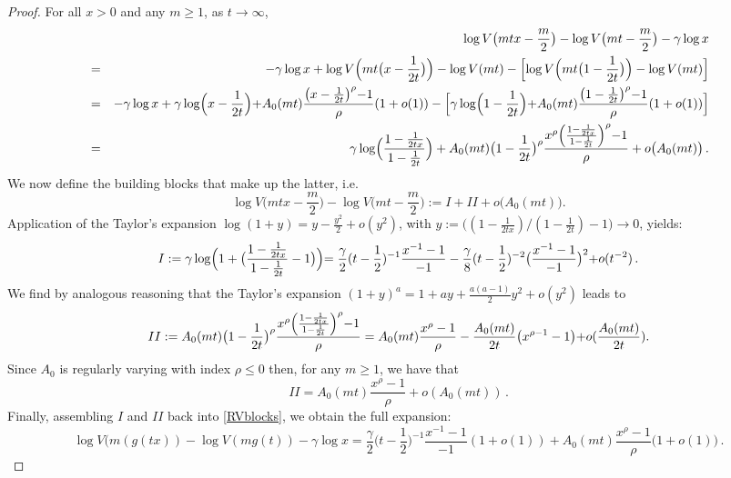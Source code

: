 \documentclass[11pt, a4paper, oneside]{article}
\numberwithin{equation}{section}
\theoremstyle{plain}
\theoremstyle{definition}
\begin{document}
\begin{proof}
        For all $x>0$ and any $m \geq 1$, as $t \rightarrow \infty$,
    \begin{eqnarray*}
 & &\log V \bigl(mtx -\frac{m}{2} \bigr) - \log V\bigl(mt -\frac{m}{2} \bigr) - \gamma\log x\\
 &=& -\gamma\log x +\log V \Bigl( mt \bigl(x -\frac{1}{2t} \bigr) \Bigr) -\log V(mt) - \Bigl[\log  V \Bigl( mt \bigl(1 -\frac{1}{2t} \bigr) \Bigr) -\log V(mt)\Bigr]\\
 &=& -\gamma\log x + \gamma\log \Bigl(x-\frac{1}{2t}\Bigl)+A_{0}(mt)\frac{\bigl(x-\frac{1}{2t}\bigl)^{\rho}-1}{\rho}(1+o(1))-\Bigl[\gamma\log\Bigl(1-\frac{1}{2t}\Bigl)+A_{0}(mt)\frac{\bigl(1-\frac{1}{2t}\bigl)^{\rho}-1}{\rho}(1+o(1))\Bigr]\\
 &=&\gamma\log \Bigl(\frac{1-\frac{1}{2tx}}{1-\frac{1}{2t}} \Bigr)+A_{0}(mt)\bigl(1-\frac{1}{2t}\bigr)^{\rho} \frac{x^{\rho} \Bigl(\frac{1-\frac{1}{2tx}}{1-\frac{1}{2t}}\Bigl)^{\rho}-1}{\rho} + o \bigl( A_0(mt)\bigr)\,.
\end{eqnarray*}
We now define the building blocks that make up the latter, i.e.
\begin{equation}\label{RVblocks}
    \log V \bigl(mtx -\frac{m}{2} \bigr) - \log V\bigl(mt -\frac{m}{2} \bigr):= I+II + o \bigl( A_0(mt)\bigr).
\end{equation}
Application of the Taylor's expansion $\log(1+y)=y-\frac{y^2}{2}+o(y^2)$, with $y:=\bigl((1-\frac{1}{2tx})/(1-\frac{1}{2t})-1\bigl) \rightarrow 0$, yields:
\begin{equation*}
	I:= \gamma\log\Bigl(1+\bigl(\frac{1-\frac{1}{2tx}}{1-\frac{1}{2t}}-1\bigl)\Bigl) = \frac{\gamma}{2}(t-\frac{1}{2})^{-1}\frac{x^{-1}-1}{-1}-\frac{\gamma}{8}(t-\frac{1}{2})^{-2}\bigl(\frac{x^{-1}-1}{-1}\bigl)^2 + o(t^{-2})\,.
\end{equation*}
We find by analogous reasoning that the Taylor's expansion $(1+y)^a=1+ay+\frac{a(a-1)}{2}y^2+o(y^2)$ leads to
\begin{equation*}
 II:= A_0(mt)\bigl(1-\frac{1}{2t}\bigr)^{\rho} \frac{x^{\rho} \Bigl(\frac{1-\frac{1}{2tx}}{1-\frac{1}{2t}}\Bigl)^{\rho}-1}{\rho} =A_{0}(mt)\frac{x^{\rho}-1}{\rho}-\frac{A_{0}(mt)}{2t}\bigl(x^{\rho-1}-1\bigl)+o(\frac{A_{0}(mt)}{2t}).
\end{equation*}
Since $A_0$ is regularly varying with index $\rho\leq 0$ then, for any $m\geq1$, we have that
\begin{equation*}
    II=A_{0}(mt)\frac{x^{\rho}-1}{\rho}+o(A_{0}(mt))\,.
\end{equation*}
Finally, assembling $I$ and $II$ back into \eqref{RVblocks}, we obtain the full expansion:
\begin{equation*}
    \log V(m(g(tx))-\log V(mg(t))-\gamma \log x=\frac{\gamma}{2}\bigl(t-\frac{1}{2}\bigl)^{-1}\frac{x^{-1}-1}{-1}(1+o(1))+A_{0}(mt)\frac{x^{\rho}-1}{\rho}\bigl(1+o(1)\bigl)\,.  
\end{equation*}
\end{proof}	
\end{document}
